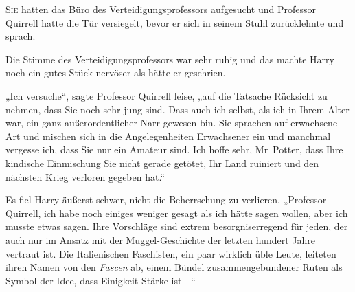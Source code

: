 
\lettrine{S}{ie} hatten das Büro des Verteidigungsprofessors aufgesucht und Professor Quirrell hatte die Tür versiegelt, bevor er sich in seinem Stuhl zurücklehnte und sprach.

Die Stimme des Verteidigungsprofessors war sehr ruhig und das machte Harry noch ein gutes Stück nervöser als hätte er geschrien.

„Ich versuche“, sagte Professor Quirrell leise, „auf die Tatsache Rücksicht zu nehmen, dass Sie noch sehr jung sind. Dass auch ich selbst, als ich in Ihrem Alter war, ein ganz außerordentlicher Narr gewesen bin. Sie sprachen auf erwachsene Art und mischen sich in die Angelegenheiten Erwachsener ein und manchmal vergesse ich, dass Sie nur ein Amateur sind. Ich hoffe sehr, Mr~Potter, dass Ihre kindische Einmischung Sie nicht gerade getötet, Ihr Land ruiniert und den nächsten Krieg verloren gegeben hat.“

Es fiel Harry äußerst schwer, nicht die Beherrschung zu verlieren. „Professor Quirrell, ich habe noch einiges weniger gesagt als ich hätte sagen wollen, aber ich musste etwas sagen. Ihre Vorschläge sind extrem besorgniserregend für jeden, der auch nur im Ansatz mit der Muggel-Geschichte der letzten hundert Jahre vertraut ist. Die Italienischen Faschisten, ein paar wirklich üble Leute, leiteten ihren Namen von den \emph{Fascen} ab, einem Bündel zusammengebundener Ruten als Symbol der Idee, dass Einigkeit Stärke ist—“

